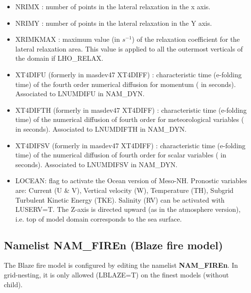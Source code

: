 \begin{itemize}
\item
{}
NRIMX : number of points  in the lateral relaxation  in the x axis. 

\item
{}
NRIMY : number of points in the lateral relaxation  in the Y axis.
\item
{}
XRIMKMAX : maximum value (in $s^{-1}$)  of the relaxation coefficient
for the lateral relaxation area. This value is applied to all the
outermost verticals of the domain if LHO\_RELAX. 

\item
{}
XT4DIFU (formerly in masdev47 XT4DIFF) : characteristic time (e-folding time)  
of the fourth order numerical diffusion for momentum ( in seconds). Associated to LNUMDIFU in NAM\_DYN.

\item
{}
XT4DIFTH (formerly in masdev47 XT4DIFF) : characteristic time (e-folding time)  of the numerical diffusion
of fourth order for meteorological variables ( in seconds). Associated to LNUMDIFTH in NAM\_DYN.

\item
{}
XT4DIFSV (formerly in masdev47 XT4DIFF) : characteristic time (e-folding time)  of the numerical diffusion
of fourth order for scalar variables ( in seconds). Associated to LNUMDIFSV in NAM\_DYN.

\item
LOCEAN: flag to activate the Ocean version of Meso-NH. Pronostic variables are: Current (U \& V), Vertical velocity (W), Temperature (TH), Subgrid Turbulent Kinetic Energy (TKE). Salinity (RV) can be activated with LUSERV=T. The Z-axis is directed upward (as in the atmosphere version), i.e. top of model domain corresponds to the sea surface. 


\end{itemize}


\subsection{Namelist NAM\_FIREn (Blaze fire model)}

The Blaze fire model is configured by editing the namelist \textbf{NAM\_FIREn}. In grid-nesting, it is only allowed (LBLAZE=T) on the finest models (without child).


